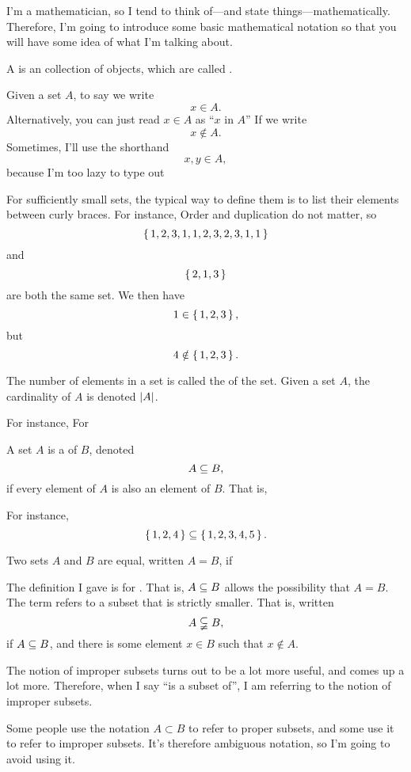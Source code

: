 I'm a mathematician, so I tend to think of---and state
things---mathematically. Therefore, I'm going to introduce some basic
mathematical notation so that you will have some idea of what I'm
talking about.

\begin{definition}
  A  is an collection of objects, which are called
  . \cite{taylor-fnds}
\end{definition}

Given a set $A$, to say  we write
$$x \in A.$$ Alternatively, you can just read $x \in A$ as ``$x$ in
$A$'' If  we write
$$x \notin A.$$ Sometimes, I'll use the shorthand $$x, y \in A,$$
because I'm too lazy to type out 

For sufficiently small sets, the typical way to define them is to list
their elements between curly braces. For instance,
 Order and duplication do not matter, so
$$\left\{ \, 1,2,3,1,1,2,3,2,3,1,1 \, \right\}$$ and $$\left\{ \, 2,1,3 \, \right\}$$ are both the same
set. We then have $$1 \in \left\{ \, 1,2,3 \, \right\},$$ but
$$4 \notin \left\{ \, 1,2,3 \, \right\}.$$

\begin{definition}
  The number of elements in a set is called the  of
  the set. Given a set $A$, the cardinality of $A$ is denoted
  $\left| A \right|$.
\end{definition}

For instance,  For

\begin{definition}
  A set $A$ is a  of $B$, denoted $$A \subseteq B,$$ if
  every element of $A$ is also an element of $B$. That is, 
\end{definition}

For instance, $$\left\{ \, 1,2,4 \, \right\} \subseteq \left\{ \, 1,2,3,4,5 \, \right\}.$$

\begin{definition}
  Two sets $A$ and $B$ are equal, written $A = B$, if
\end{definition}

\begin{remark}
  The definition I gave is for . That is,
  $A \subseteq B$ allows the possibility that $A = B$. The term
   refers to a subset that is strictly
  smaller. That is,  written
  $$A \subsetneqq B,$$ if $A \subseteq B$, and there is some element
  $x \in B$ such that $x \notin A$.

  The notion of improper subsets turns out to be a lot more useful,
  and comes up a lot more. Therefore, when I say ``is a subset of'', I
  am referring to the notion of improper subsets.

  Some people use the notation $A \subset B$ to refer to proper
  subsets, and some use it to refer to improper subsets. It's
  therefore ambiguous notation, so I'm going to avoid using it.
\end{remark}

